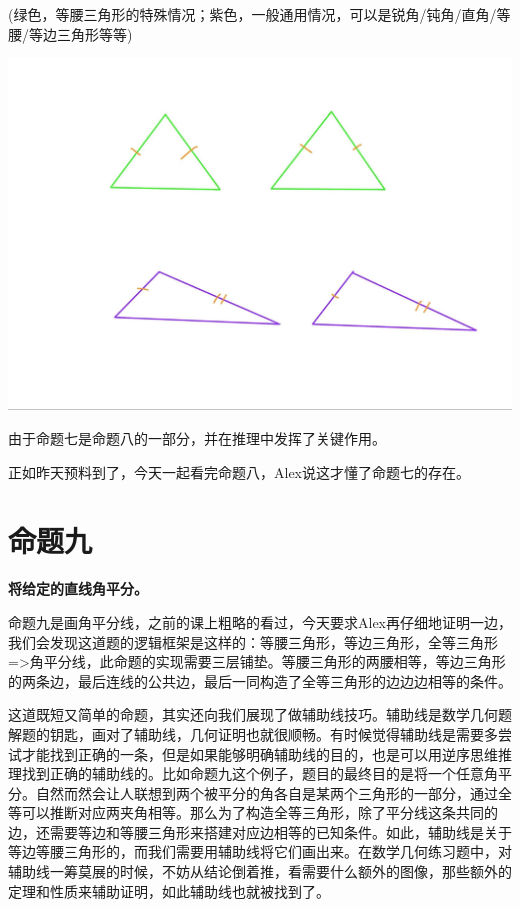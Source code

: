 \documentclass[
]{book}
\begin{document}
(绿色，等腰三角形的特殊情况；紫色，一般通用情况，可以是锐角/钝角/直角/等腰/等边三角形等等)

\includegraphics[width=1\linewidth]{./image/07-prop8-image9}

由于命题七是命题八的一部分，并在推理中发挥了关键作用。

正如昨天预料到了，今天一起看完命题八，Alex说这才懂了命题七的存在。

\hypertarget{ux547dux9898ux4e5d}{%
\section{命题九}\label{ux547dux9898ux4e5d}}

\textbf{将给定的直线角平分。}

命题九是画角平分线，之前的课上粗略的看过，今天要求Alex再仔细地证明一边，我们会发现这道题的逻辑框架是这样的：等腰三角形，等边三角形，全等三角形=\textgreater 角平分线，此命题的实现需要三层铺垫。等腰三角形的两腰相等，等边三角形的两条边，最后连线的公共边，最后一同构造了全等三角形的边边边相等的条件。

这道既短又简单的命题，其实还向我们展现了做辅助线技巧。辅助线是数学几何题解题的钥匙，画对了辅助线，几何证明也就很顺畅。有时候觉得辅助线是需要多尝试才能找到正确的一条，但是如果能够明确辅助线的目的，也是可以用逆序思维推理找到正确的辅助线的。比如命题九这个例子，题目的最终目的是将一个任意角平分。自然而然会让人联想到两个被平分的角各自是某两个三角形的一部分，通过全等可以推断对应两夹角相等。那么为了构造全等三角形，除了平分线这条共同的边，还需要等边和等腰三角形来搭建对应边相等的已知条件。如此，辅助线是关于等边等腰三角形的，而我们需要用辅助线将它们画出来。在数学几何练习题中，对辅助线一筹莫展的时候，不妨从结论倒着推，看需要什么额外的图像，那些额外的定理和性质来辅助证明，如此辅助线也就被找到了。
\end{document}
